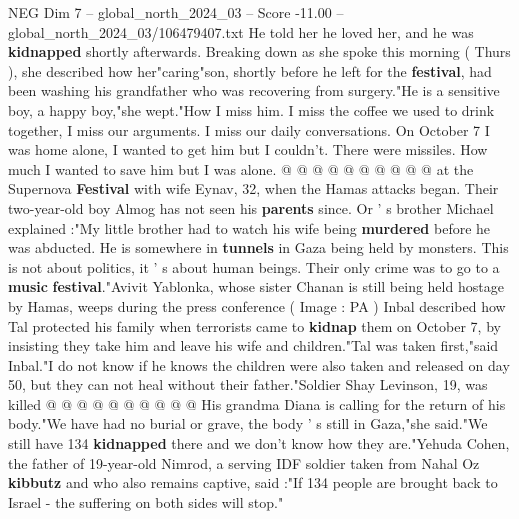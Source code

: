 \begin{textsample}{NEG Dim 7 – global\_north\_2024\_03 – Score -11.00 – global\_north\_2024\_03/106479407.txt}
He told her he loved her, and he was \textbf{kidnapped} shortly afterwards.
Breaking down as she spoke this morning ( Thurs ), she described how her"caring"son, shortly before he left for the \textbf{festival}, had been washing his grandfather who was recovering from surgery."He is a sensitive boy, a happy boy,"she wept."How I miss him.
I miss the coffee we used to drink together, I miss our arguments.
I miss our daily conversations.
On October 7 I was home alone, I wanted to get him but I couldn't.
There were missiles.
How much I wanted to save him but I was alone. @ @ @ @ @ @ @ @ @ @ at the Supernova \textbf{Festival} with wife Eynav, 32, when the Hamas attacks began.
Their two-year-old boy Almog has not seen his \textbf{parents} since.
Or ' s brother Michael explained :"My little brother had to watch his wife being \textbf{murdered} before he was abducted.
He is somewhere in \textbf{tunnels} in Gaza being held by monsters.
This is not about politics, it ' s about human beings.
Their only crime was to go to a \textbf{music} \textbf{festival}."Avivit Yablonka, whose sister Chanan is still being held hostage by Hamas, weeps during the press conference ( Image : PA ) Inbal described how Tal protected his family when terrorists came to \textbf{kidnap} them on October 7, by insisting they take him and leave his wife and children."Tal was taken first,"said Inbal."I do not know if he knows the children were also taken and released on day 50, but they can not heal without their father."Soldier Shay Levinson, 19, was killed @ @ @ @ @ @ @ @ @ @ His grandma Diana is calling for the return of his body."We have had no burial or grave, the body ' s still in Gaza,"she said."We still have 134 \textbf{kidnapped} there and we don't know how they are."Yehuda Cohen, the father of 19-year-old Nimrod, a serving IDF soldier taken from Nahal Oz \textbf{kibbutz} and who also remains captive, said :"If 134 people are brought back to Israel - the suffering on both sides will stop."

\end{textsample}
